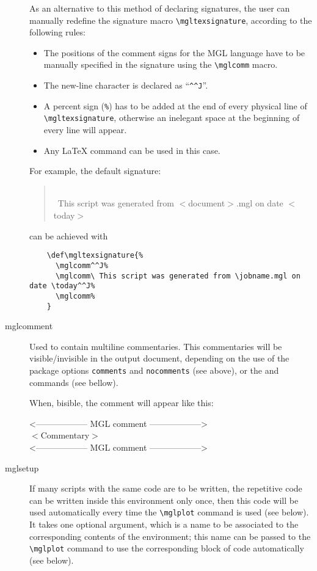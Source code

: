 \documentclass{article}
\begin{document}
\begin{description}
As an alternative to this method of declaring signatures, the user can manually redefine the signature macro \texttt{\textbackslash{}mgltexsignature}, according to the following rules:
  \begin{itemize}
    \item The positions of the comment signs for the MGL language have to be manually specified in the signature using the \texttt{\textbackslash{}mglcomm} macro.
    \item The new-line character is declared as ``\verb|^^J|''.
    \item A percent sign (\texttt{\%}) has to be added at the end of every physical line of \texttt{\textbackslash{}mgltexsignature}, otherwise an inelegant space at the beginning of every line will appear.
  \item Any \LaTeX{} command can be used in this case.
\end{itemize}
  For example, the default signature:
  \begin{mglcomment}
  \begin{quote}\small
    \mglcomm\\
    \mglcomm\ This script was generated from $<$document$>$.mgl on date $<$today$>$\\
    \mglcomm
  \end{quote}
  \end{mglcomment}
  can be achieved with
  \begin{verbatim}
    \def\mgltexsignature{%
      \mglcomm^^J%
      \mglcomm\ This script was generated from \jobname.mgl on date \today^^J%
      \mglcomm%
    }
  \end{verbatim}
\item[mglcomment]
  Used to contain multiline commentaries. This commentaries will be visible/invisible in the output document, depending on the use of the package options \texttt{comments} and \texttt{nocomments} (see above), or the \texttt{\mglcomments} and \texttt{\mglnocomments} commands (see bellow).
  
  When, bisible, the comment will appear like this:
  \begin{center}
    \makeatletter
    \verbatim@font
    \makeatother
    <------------------ MGL comment ------------------>\\
    $<$Commentary$>$\\
    <------------------ MGL comment ------------------>\\
  \end{center}
\item[mglsetup]
	If many scripts with the same code are to be written, the repetitive code can be written inside this environment only once, then this code will be used automatically every time the \texttt{\textbackslash{}mglplot} command is used (see below). It takes one optional argument, which is a name to be associated to the corresponding contents of the environment; this name can be passed to the \texttt{\textbackslash{}mglplot} command to use the corresponding block of code automatically (see below).
\end{description}
\end{document}
